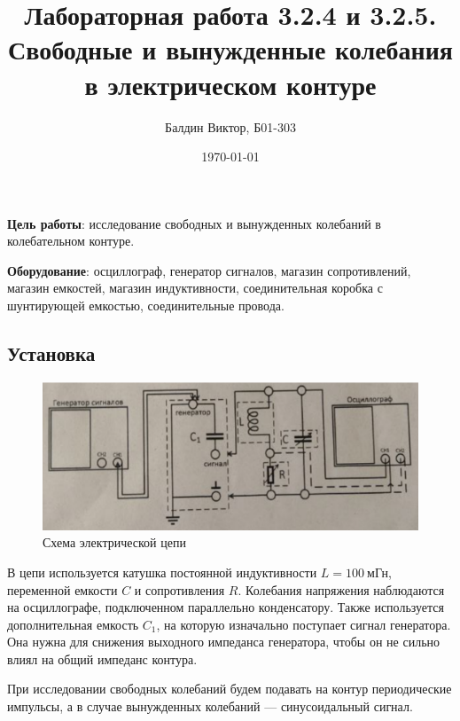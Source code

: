 \documentclass[a4paper, 12pt]{article}
\title{Лабораторная работа 3.2.4 и 3.2.5. \\ Свободные и вынужденные колебания в электрическом контуре}
\author{Балдин Виктор, Б01-303}
\date{\today}
\begin{document}
	\maketitle
	\textbf{Цель работы}: исследование свободных и вынужденных колебаний в колебательном контуре.

	\textbf{Оборудование}: осциллограф, генератор сигналов, магазин сопротивлений, магазин емкостей, магазин индуктивности, соединительная коробка с шунтирующей емкостью, соединительные провода.
	\subsection*{Установка}
	\begin{figure}[h]
		\includegraphics[width = \textwidth]{Scheme.png}
		\caption{Схема электрической цепи}
	\end{figure}

	В цепи используется катушка постоянной индуктивности $L = 100 \ \text{мГн}$, переменной емкости $C$ и сопротивления $R$. Колебания напряжения наблюдаются на осциллографе, подключенном параллельно конденсатору. Также используется дополнительная емкость $C_1$, на которую изначально поступает сигнал генератора. Она нужна для снижения выходного импеданса генератора, чтобы он не сильно влиял на общий импеданс контура.

	При исследовании свободных колебаний будем подавать на контур периодические импульсы, а в случае вынужденных колебаний --- синусоидальный сигнал.
	\newpage



\end{document}
